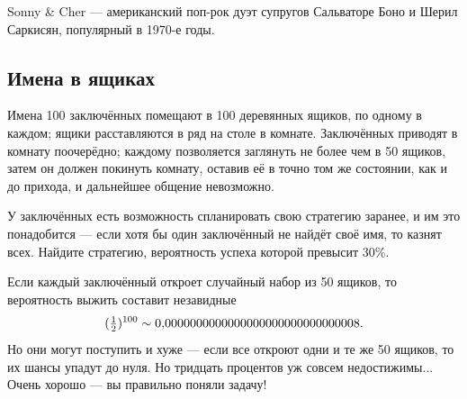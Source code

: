 \begin{addedbytheeditors}
    Sonny \& Cher --- американский поп-рок дуэт супругов Сальваторе Боно и Шерил Саркисян, популярный в 1970-е годы.
\end{addedbytheeditors}

\subsection*{Имена в ящиках}\label{Имена в ящиках}

Имена 100 заключённых помещают в 100 деревянных ящиков, по одному в каждом;
ящики расставляются в ряд на столе в комнате.
Заключённых приводят в комнату поочерёдно;
каждому позволяется заглянуть не более чем в 50 ящиков,
затем он должен покинуть комнату, оставив её в точно том же состоянии, как и до прихода, и дальнейшее общение невозможно.

У заключённых есть возможность спланировать свою стратегию заранее, и им это понадобится --- если хотя бы один заключённый не найдёт своё имя, то казнят всех.
Найдите стратегию, вероятность успеха которой превысит 30\%.

 Если каждый заключённый откроет случайный набор из 50 ящиков, то вероятность выжить составит незавидные
\[(\tfrac12)^{100}\z\sim 0{,}0000000000000000000000000000008.\]
Но они могут поступить и хуже --- если все откроют одни и те же 50 ящиков, то их шансы упадут до нуля.
Но тридцать процентов уж совсем недостижимы...
Очень хорошо --- вы правильно поняли задачу!
